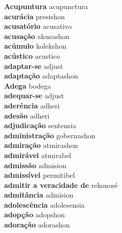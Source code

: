 \textbf{ Acupuntura  } acupunctura \\
\textbf{ acurácia  } presishon \\
\textbf{ acusatório  } acusativo \\
\textbf{ acusação  } akusashon \\
\textbf{ acúmulo  } kolekshon \\
\textbf{ acústico  } acustico \\
\textbf{ adaptar-se  } adjust \\
\textbf{ adaptação  } adaptashon \\
\textbf{ Adega  } bodega \\
\textbf{ adequar-se  } adjust \\
\textbf{ aderência  } adheri \\
\textbf{ adesão  } adheri \\
\textbf{ adjudicação  } sentensia \\
\textbf{ administração  } gobernashon \\
\textbf{ admiração  } atmirashon \\
\textbf{ admirável  } atmirabel \\
\textbf{ admissão  } admision \\
\textbf{ admissível  } permitibel \\
\textbf{ admitir a veracidade de  } rekonosé \\
\textbf{ admitância  } admision \\
\textbf{ adolescência  } adolesensia \\
\textbf{ adopção  } adopshon \\
\textbf{ adoração  } adorashon \\
